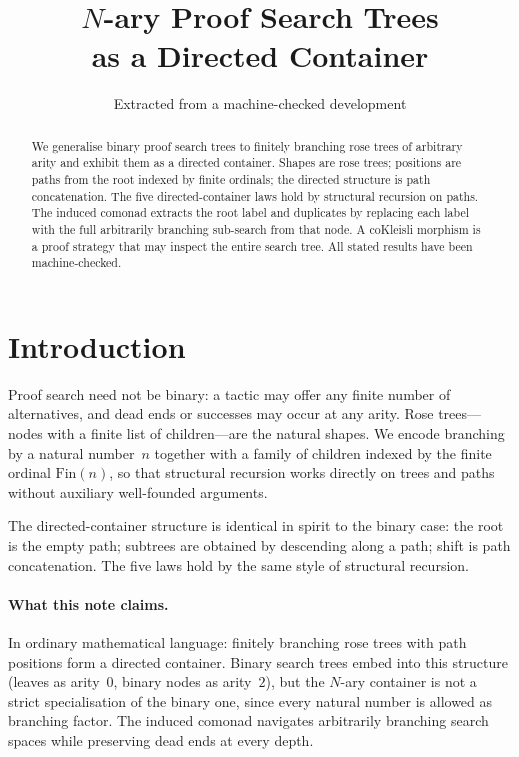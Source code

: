 \documentclass[11pt,a4paper]{article}
\title{$N$-ary Proof Search Trees\\
  as a Directed Container}
\author{Extracted from a machine-checked development}
\date{}
\theoremstyle{plain}
\theoremstyle{definition}
\newcommand{\Fin}{\mathrm{Fin}}
\begin{document}
\maketitle

\begin{abstract}
We generalise binary proof search trees to finitely branching rose trees
of arbitrary arity and exhibit them as a directed container. Shapes are
rose trees; positions are paths from the root indexed by finite ordinals;
the directed structure is path concatenation. The five directed-container
laws hold by structural recursion on paths. The induced comonad extracts
the root label and duplicates by replacing each label with the full
arbitrarily branching sub-search from that node. A coKleisli morphism is
a proof strategy that may inspect the entire search tree. All stated
results have been machine-checked.
\end{abstract}

\tableofcontents
\bigskip

\section{Introduction}

Proof search need not be binary: a tactic may offer any finite number of
alternatives, and dead ends or successes may occur at any arity. Rose
trees---nodes with a finite list of children---are the natural shapes.
We encode branching by a natural number~$n$ together with a family of
children indexed by the finite ordinal $\Fin(n)$, so that structural
recursion works directly on trees and paths without auxiliary
well-founded arguments.

The directed-container structure is identical in spirit to the binary
case: the root is the empty path; subtrees are obtained by descending
along a path; shift is path concatenation. The five laws hold by the
same style of structural recursion.

\paragraph{What this note claims.}
In ordinary mathematical language: finitely branching rose trees with
path positions form a directed container. Binary search trees embed into
this structure (leaves as arity~$0$, binary nodes as arity~$2$), but the
$N$-ary container is not a strict specialisation of the binary one,
since every natural number is allowed as branching factor. The induced
comonad navigates arbitrarily branching search spaces while preserving
dead ends at every depth.
\end{document}
